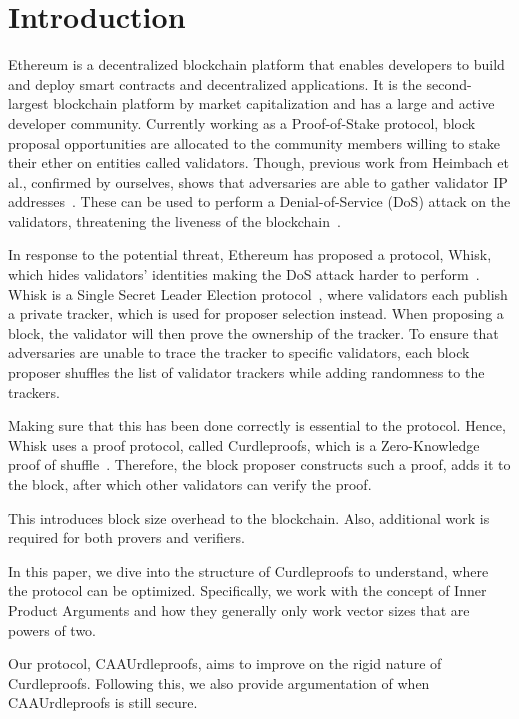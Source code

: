 

\section{Introduction}\label{sec:introduction}
Ethereum is a decentralized blockchain platform that enables developers to build and deploy smart contracts and decentralized applications.
It is the second-largest blockchain platform by market capitalization and has a large and active developer community.
Currently working as a Proof-of-Stake protocol, block proposal opportunities are allocated to the community members willing to stake their ether on entities called validators.
Though, previous work from Heimbach et al., confirmed by ourselves, shows that adversaries are able to gather validator IP addresses~\cite{heimbach2024deanonymizingethereumvalidatorsp2p,ouroldpaper}.
These can be used to perform a Denial-of-Service (DoS) attack on the validators, threatening the liveness of the blockchain~\cite{EthereumAttackDefense2024,ouroldpaper}.

In response to the potential threat, Ethereum has proposed a protocol, Whisk, which hides validators' identities making the DoS attack harder to perform~\cite{Whisk2024}.
Whisk is a Single Secret Leader Election protocol~\cite{10.1145/3419614.3423258}, where validators each publish a private tracker, which is used for proposer selection instead.
When proposing a block, the validator will then prove the ownership of the tracker.
To ensure that adversaries are unable to trace the tracker to specific validators, each block proposer shuffles the list of validator trackers while adding randomness to the trackers.

Making sure that this has been done correctly is essential to the protocol.
Hence, Whisk uses a proof protocol, called Curdleproofs, which is a Zero-Knowledge proof of shuffle~\cite{Curdleproofs}.
Therefore, the block proposer constructs such a proof, adds it to the block, after which other validators can verify the proof.

This introduces block size overhead to the blockchain.
Also, additional work is required for both provers and verifiers.

In this paper, we dive into the structure of Curdleproofs to understand, where the protocol can be optimized.
Specifically, we work with the concept of Inner Product Arguments and how they generally only work vector sizes that are powers of two.

Our protocol, CAAUrdleproofs, aims to improve on the rigid nature of Curdleproofs.
Following this, we also provide argumentation of when CAAUrdleproofs is still secure.

